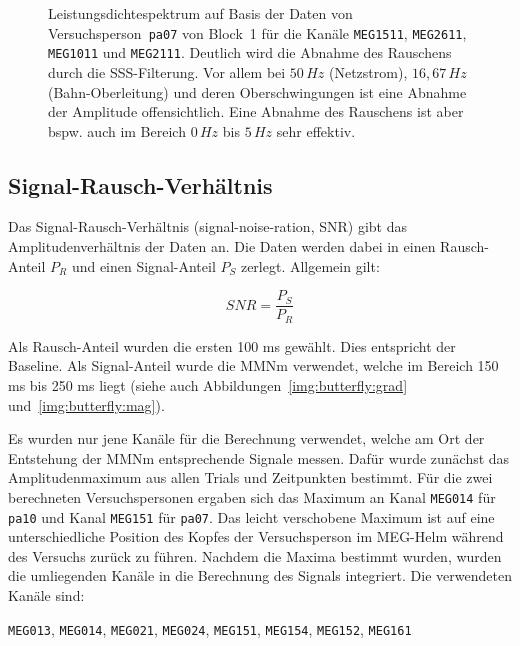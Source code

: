 \documentclass[doc,a4paper,12pt]{apa6}
\begin{document}
\begin{figure}
\begin{subfigure}[c]{0.43\textwidth}
    \label{img:freq-analy-sss}
  \end{subfigure}
  \captionsetup{justification=justified}
  \vspace*{3mm}
  \caption[Leistungsdichtespektrum auf Basis eines Blocks]{Leistungsdichtespektrum auf Basis der Daten von Versuchsperson~\texttt{pa07} von Block~1 für die Kanäle \texttt{MEG1511}, \texttt{MEG2611}, \texttt{MEG1011} und \texttt{MEG2111}. Deutlich wird die Abnahme des Rauschens durch die SSS-Filterung. Vor allem bei $50\,Hz$ (Netzstrom), $16,67\,Hz$ (Bahn-Oberleitung) und deren Oberschwingungen ist eine Abnahme der Amplitude offensichtlich. Eine Abnahme des Rauschens ist aber bspw. auch im Bereich $0\,Hz$ bis $5\,Hz$ sehr effektiv.}
  \label{img:freq-analy}
\end{figure}

\subsection{Signal-Rausch-Verhältnis}
\label{sec:snr}

Das Signal-Rausch-Verhältnis (signal-noise-ration, SNR) gibt das Amplitudenverhältnis der Daten an. Die Daten werden dabei in einen Rausch-Anteil $P_R$ und einen Signal-Anteil $P_S$ zerlegt. Allgemein gilt:

\begin{equation}
SNR = \frac{P_S}{P_R}
\end{equation}

Als Rausch-Anteil wurden die ersten 100 ms gewählt. Dies entspricht der Baseline. Als Signal-Anteil wurde die MMNm verwendet, welche im Bereich 150 ms bis 250 ms liegt (siehe auch Abbildungen~\ref{img:butterfly:grad} und~\ref{img:butterfly:mag}).

Es wurden nur jene Kanäle für die Berechnung verwendet, welche am Ort der Entstehung der MMNm entsprechende Signale messen. Dafür wurde zunächst das Amplitudenmaximum aus allen Trials und Zeitpunkten bestimmt. Für die zwei berechneten Versuchspersonen ergaben sich das Maximum an Kanal \texttt{MEG014} für \texttt{pa10} und Kanal \texttt{MEG151} für \texttt{pa07}. Das leicht verschobene Maximum ist auf eine unterschiedliche Position des Kopfes der Versuchsperson im MEG-Helm während des Versuchs zurück zu führen. Nachdem die Maxima bestimmt wurden, wurden die umliegenden Kanäle in die Berechnung des Signals integriert. Die verwendeten Kanäle sind:

\texttt{MEG013}, \texttt{MEG014}, \texttt{MEG021}, \texttt{MEG024}, \texttt{MEG151}, \texttt{MEG154}, \texttt{MEG152}, \texttt{MEG161}
\end{document}
